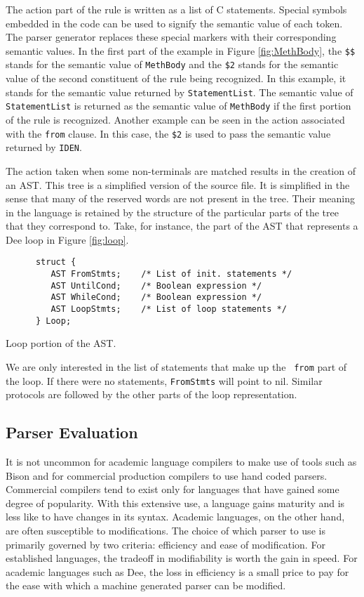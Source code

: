 The action part of the rule is written as a list of C statements.
Special symbols embedded in the code can be used to signify the
semantic value of each token.  The parser generator replaces these
special markers with their corresponding semantic values.  In the
first part of the example in Figure \ref{fig:MethBody}, the {\tt \$\$}
stands for the semantic value of {\tt MethBody} and the {\tt \$2}
stands for the semantic value of the second constituent of the rule
being recognized.  In this example, it stands for the semantic value
returned by {\tt StatementList}.  The semantic value of {\tt
StatementList} is returned as the semantic value of {\tt MethBody} if
the first portion of the rule is recognized.  Another example can be
seen in the action associated with the {\tt from} clause.  In this
case, the {\tt \$2} is used to pass the semantic value returned by
{\tt IDEN}.

The action taken when some non-terminals are matched results in the
creation of an AST.  This tree is a simplified version of the source
file.  It is simplified in the sense that many of the reserved words
are not present in the tree.  Their meaning in the language is retained
by the structure of the particular parts of the tree that they
correspond to.  Take, for instance, the part of the AST that
represents a Dee loop in Figure \ref{fig:loop}.

\begin{shortfigure}
\begin{verbatim}
      struct {
         AST FromStmts;    /* List of init. statements */
         AST UntilCond;    /* Boolean expression */
         AST WhileCond;    /* Boolean expression */
         AST LoopStmts;    /* List of loop statements */
      } Loop;
\end{verbatim}
\caption{Loop portion of the AST.}
\label{fig:loop}
\end{shortfigure}

We are only interested in the list of statements that make up the {\tt
from} part of the loop.  If there were no statements, {\tt FromStmts}
will point to nil.  Similar protocols are followed by the other parts
of the loop representation.

\subsection{Parser Evaluation}

It is not uncommon for academic language compilers to make use of
tools such as Bison and for commercial production compilers to
use hand coded parsers.  Commercial compilers tend to exist only for
languages that have gained some degree of popularity.  With this
extensive use, a language gains maturity and is less like to have
changes in its syntax.  Academic languages, on the other hand, are
often susceptible to modifications.  The choice of which parser to use
is primarily governed by two criteria: efficiency and ease of
modification.  For established languages, the tradeoff in
modifiability is worth the gain in speed.  For academic languages such
as Dee, the loss in efficiency is a small price to pay for the ease
with which a machine generated parser can be modified.

